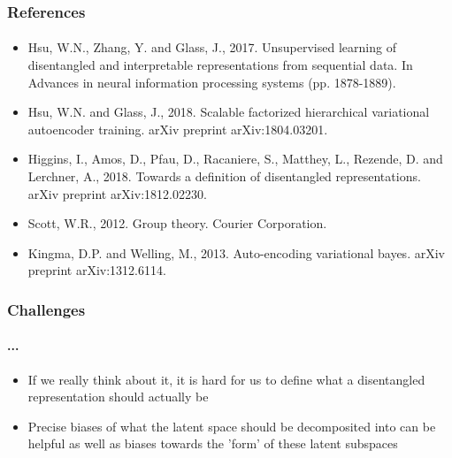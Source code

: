 \documentclass[9pt]{beamer}
\begin{document}
\begin{frame}
\frametitle{References}
\framesubtitle{}
\begin{itemize}
	\item Hsu, W.N., Zhang, Y. and Glass, J., 2017. Unsupervised learning of disentangled and interpretable representations from sequential data. In Advances in neural information processing systems (pp. 1878-1889).
	\item Hsu, W.N. and Glass, J., 2018. Scalable factorized hierarchical variational autoencoder training. arXiv preprint arXiv:1804.03201.
	\item Higgins, I., Amos, D., Pfau, D., Racaniere, S., Matthey, L., Rezende, D. and Lerchner, A., 2018. Towards a definition of disentangled representations. arXiv preprint arXiv:1812.02230.
	\item Scott, W.R., 2012. Group theory. Courier Corporation.
	\item Kingma, D.P. and Welling, M., 2013. Auto-encoding variational bayes. arXiv preprint arXiv:1312.6114.
\end{itemize}
\end{frame} 










\begin{frame}
\frametitle{Challenges}
\framesubtitle{...}
\begin{itemize}%
	\item If we really think about it, it is hard for us to define what a disentangled representation should actually be
	\item Precise biases of what the latent space should be decomposited into can be helpful as well as biases towards the 'form' of these latent subspaces
\end{itemize}
\end{frame} 
\end{document}
